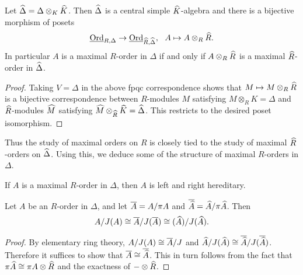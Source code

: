 \begin{prop}
Let $\widehat\Delta = \Delta\otimes_K\widehat K$.  Then $\widehat\Delta$ is a central simple $\widehat{K}$-algebra and there is a bijective morphism of posets
$$\Ord_{R,\Delta}\rightarrow\Ord_{\wh{R},\wh\Delta},\ \ A\mapsto A\otimes_R\wh{R}.$$
In particular $A$ is a maximal $R$-order in $\Delta$ if and only if $A\otimes_R\widehat{R}$ is a maximal $\widehat{R}$-order in $\widehat{\Delta}$.
\end{prop}
\begin{proof}
Taking $V = \Delta$ in the above fpqc correspondence shows that $M\mapsto M\otimes_R\widehat R$ is a bijective correspondence between $R$-modules $M$ satisfying $M\otimes_R K = \Delta$ and $\widehat R$-modules $\widehat M$ satisfying $\widehat M\otimes_{\widehat R}\widehat K = \widehat \Delta$.  This restricts to the desired poset isomorphism.
\end{proof}
Thus the study of maximal orders on $R$ is closely tied to the study of maximal $\widehat R$-orders on $\widehat \Delta$.  Using this, we deduce some of the structure of maximal $R$-orders in $\Delta$.

\begin{cor}
If $A$ is a maximal $R$-order in $\Delta$, then $A$ is left and right hereditary.
\end{cor}

\begin{prop}
Let $A$ be an $R$-order in $\Delta$, and let $\overline{A} = A/\pi A$ and $\overline{\widehat A} = \widehat A/\pi \widehat A$.  Then
$$A/J(A)\cong \overline{A}/J(\overline{A})\cong (\widehat A)/J(\widehat A).$$
\end{prop}
\begin{proof}
By elementary ring theory, $A/J(A)\cong \overline{A}/J$ and $\widehat A/J(\widehat A)\cong \overline{\widehat A}/J(\overline{\widehat A})$.  Therefore it suffices to show that $\overline{A}\cong\overline{\widehat A}$.  This in turn follows from the fact that $\pi\widehat A \cong \pi A \otimes\widehat R$ and the exactness of $-\otimes\widehat R$.
\end{proof}


